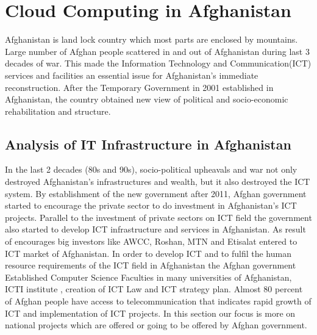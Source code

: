 
\chapter{Cloud Computing in Afghanistan} %

\label{Chapter 6} %


Afghanistan is land lock country which most parts are enclosed by mountains.  Large  number of Afghan people scattered in and out of Afghanistan during last 3 decades of war.  This made the Information Technology and Communication(ICT) services and facilities an essential issue for Afghanistan’s immediate reconstruction. After the Temporary Government in 2001 established in Afghanistan, the country obtained new view of political and socio-economic rehabilitation and structure. 

\section{Analysis of IT‌ Infrastructure in Afghanistan}
In the last 2 decades (80s and 90s), socio-political upheavals and war not only destroyed Afghanistan’s infrastructures and wealth, but it also destroyed the ICT  system. By establishment of the new government after 2011, Afghan government started to encourage the private sector to do investment in Afghanistan's ICT projects. Parallel to the investment of private sectors on ICT field  the government also started to develop ICT infrastructure and services in Afghanistan. As result of encourages big investors like AWCC, Roshan, MTN and Etisalat entered to ICT market of Afghanistan. In order to develop ICT and to fulfil the human resource requirements of the ICT field in Afghanistan the Afghan government Established Computer Science Faculties in many universities of Afghanistan, ICTI institute , creation of ICT Law and ICT strategy plan. Almost 80 percent of Afghan people have access to telecommunication that indicates rapid growth of ICT and implementation of ICT projects. In this section our focus is more on national projects which are offered or going to be offered by Afghan government.\cite{afg1}\\

